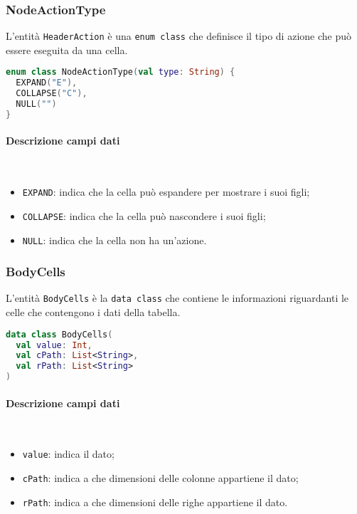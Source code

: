 \subsubsection{NodeActionType}
L'entità \verb|HeaderAction| è una \verb|enum class| che definisce il tipo di azione che può essere eseguita da una cella.
\begin{lstlisting}[caption={NodeActionType}, label={lst:nodeactiontype}, language=Kotlin]
enum class NodeActionType(val type: String) {
  EXPAND("E"),
  COLLAPSE("C"),
  NULL("")
}
\end{lstlisting}
\paragraph{Descrizione campi dati} \mbox{} \\
\begin{itemize}
	\item \verb|EXPAND|:  indica che la cella può espandere per mostrare i suoi figli;
	\item \verb|COLLAPSE|: indica che la cella può nascondere i suoi figli;
	\item \verb|NULL|: indica che la cella non ha un'azione.
\end{itemize}

\subsubsection{BodyCells}
L'entità \verb|BodyCells| è la \verb|data class| che contiene le informazioni riguardanti le celle che contengono i dati della tabella.
\begin{lstlisting}[caption={BodyCells}, label={lst:bodycells}, language=Kotlin]
data class BodyCells(
  val value: Int,
  val cPath: List<String>,
  val rPath: List<String>
)
\end{lstlisting}
\paragraph{Descrizione campi dati} \mbox{} \\
\begin{itemize}
	\item \verb|value|: indica il dato;
	\item \verb|cPath|: indica a che dimensioni delle colonne appartiene il dato;
	\item \verb|rPath|: indica a che dimensioni delle righe appartiene il dato.
\end{itemize}

